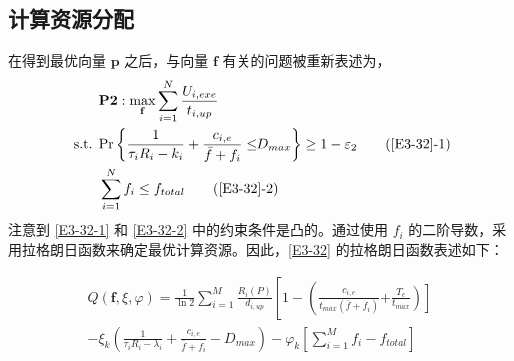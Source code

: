 \subsection{计算资源分配}\label{section3-3-4}
在得到最优向量 $\mathbf{p}$ 之后，与向量 $\mathbf{f}$ 有关的问题被重新表述为，
\begin{align}
& \textbf{P2}:\max\limits_{\mathbf{f}}\sum_{i=1}^{N}\frac{U_{i,exe}}{t_{i,up}}                                      \label{E3-32}\\
\text { s.t. }
& \textrm{Pr}\left\{\frac{1}{\tau_iR_i-k_i}+\frac{c_{i,e}}{\bar{f}+f_i}\le \!\!D_{max}\right\}\geq1-\varepsilon_2  \tag{\ref{E3-32}{-1}}      \label{E3-32-1}\\  %
& \sum_{i=1}^{N}f_i\le f_{total}                                                                                   \tag{\ref{E3-32}{-2}}      \label{E3-32-2}  %
\end{align}
注意到 \eqref{E3-32-1} 和 \eqref{E3-32-2} 中的约束条件是凸的。通过使用 $f_i$ 的二阶导数，采用拉格朗日函数来确定最优计算资源。因此，\eqref{E3-32} 的拉格朗日函数表述如下：

\begin{equation}\label{E33}
\begin{aligned}
Q\left(\mathbf{f},\xi,\varphi\right)=\frac{1}{\ln{2}}\sum_{i=1}^{M}\frac{R_i\left(P\right)}{ d_{i,up}}
\left[1-
\left(\frac{c_{i,e}}{t_{max}\left(\bar{f}+f_i\right)}
\right.\right.
\left.\left.
+\frac{T_c}{t_{max}}
\right)
\right]\\
-\xi_k\left(\frac{1}{\tau_iR_i-\lambda_i}+\frac{c_{i,e}}{\bar{f}+f_i}-D_{max}\right)
-\varphi_k\left[\sum_{i=1}^{M}f_i-f_{total}\right]
\end{aligned}
\end{equation}
